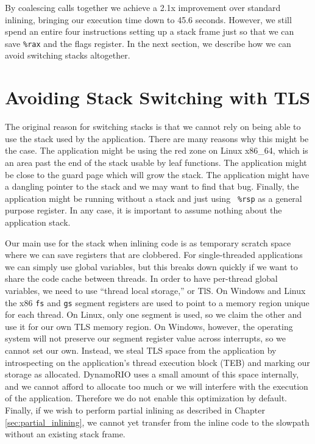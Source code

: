 By coalescing calls together we achieve a 2.1x improvement over standard
inlining, bringing our execution time down to 45.6 seconds.  However, we still
spend an entire four instructions setting up a stack frame just so that we can
save {\tt \%rax} and the flags register.  In the next section, we describe how
we can avoid switching stacks altogether.

\section{Avoiding Stack Switching with TLS}
\label{sec:tls_scratch}

The original reason for switching stacks is that we cannot rely on being able to
use the stack used by the application.  There are many reasons why this might be
the case.  The application might be using the red zone on Linux x86\_64, which
is an area past the end of the stack usable by leaf functions.  The application
might be close to the guard page which will grow the stack.  The application
might have a dangling pointer to the stack and we may want to find that bug.
Finally, the application might be running without a stack and just using {\tt
\%rsp} as a general purpose register.  In any case, it is important to assume
nothing about the application stack.

Our main use for the stack when inlining code is as temporary scratch space
where we can save registers that are clobbered.  For single-threaded
applications we can simply use global variables, but this breaks down quickly if
we want to share the code cache between threads.  In order to have per-thread
global variables, we need to use ``thread local storage,'' or TlS.  On Windows
and Linux the x86 {\tt fs} and {\tt gs} segment registers are used to point to a
memory region unique for each thread.  On Linux, only one segment is used, so we
claim the other and use it for our own TLS memory region.  On Windows, however,
the operating system will not preserve our segment register value across
interrupts, so we cannot set our own.  Instead, we steal TLS space from the
application by introspecting on the application's thread execution block (TEB)
and marking our storage as allocated.\cite{inside_win2k}  DynamoRIO uses a small
amount of this space internally, and we cannot afford to allocate too much or we
will interfere with the execution of the application.  Therefore we do not
enable this optimization by default.  Finally, if we wish to perform partial
inlining as described in Chapter \ref{sec:partial_inlining}, we cannot yet
transfer from the inline code to the slowpath without an existing stack frame.

